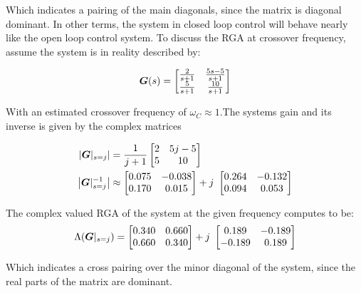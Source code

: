 Which indicates a pairing of the main diagonals, since the matrix is diagonal dominant. In other terms, the system in closed loop control will behave nearly like the open loop control system. To discuss the RGA at crossover frequency, assume the system is in reality described by:

\begin{align}
\mbox{\boldmath$G$}(s) = \begin{bmatrix}
\frac{2}{s +1} & \frac{5s-5}{s +1} \\
\frac{5}{s +1} & \frac{10}{s +1}
\end{bmatrix}
\end{align}

With an estimated crossover frequency of $\omega_C \approx 1$.The systems gain and its inverse is given by the complex matrices

\begin{align}
\begin{split}
\left|\mbox{\boldmath$G$}|_{s=j}\right| &= \frac{1}{j+1} \begin{bmatrix}
2 & 5j-5 \\
5 & 10
\end{bmatrix} \\
\left| \mbox{\boldmath$G$}|_{s=j}^{-1} \right| &\approx \begin{bmatrix}
0.075 & -0.038 \\
0.170 & 0.015
\end{bmatrix} + j~\begin{bmatrix}
0.264 & -0.132 \\
0.094 & 0.053 
\end{bmatrix}
\end{split}
\end{align}

The complex valued RGA of the system at the given frequency computes to be:\\

\begin{align}
\Lambda(\mbox{\boldmath$G$}|_{s=j}) = \begin{bmatrix}
0.340 & 0.660 \\
0.660 & 0.340 
\end{bmatrix}
+ j~\begin{bmatrix}
0.189 & -0.189 \\
-0.189 & 0.189
\end{bmatrix}
\end{align}

Which indicates a cross pairing over the minor diagonal of the system, since the real parts of the matrix are dominant.\\

